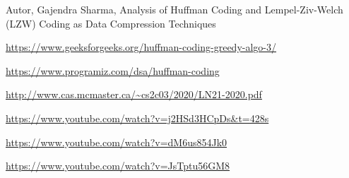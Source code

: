 \documentclass[runningheads]{llncs}
\begin{document}
\begin{thebibliography}{8}
Autor, Gajendra Sharma, Analysis of Huffman Coding and Lempel-Ziv-Welch (LZW) Coding as
Data Compression Techniques\textbf{}

\url{https://www.geeksforgeeks.org/huffman-coding-greedy-algo-3/}

\url{https://www.programiz.com/dsa/huffman-coding}

\url{http://www.cas.mcmaster.ca/~cs2c03/2020/LN21-2020.pdf}

\url{https://www.youtube.com/watch?v=j2HSd3HCpDs\&t=428s}

\url{https://www.youtube.com/watch?v=dM6us854Jk0}

\url{https://www.youtube.com/watch?v=JsTptu56GM8}

\end{thebibliography}
\end{document}
